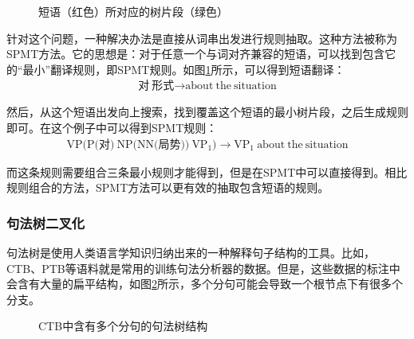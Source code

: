 \begin{figure}[htp]
\centering

\caption{短语（红色）所对应的树片段（绿色）}
\label{fig:4-57}
\end{figure}

\parinterval 针对这个问题，一种解决办法是直接从词串出发进行规则抽取。这种方法被称为SPMT方法\cite{marcu2006spmt:}。它的思想是：对于任意一个与词对齐兼容的短语，可以找到包含它的``最小''翻译规则，即SPMT规则。如图\ref{fig:4-57}所示，可以得到短语翻译：
\begin{eqnarray}
\textrm{对}\ \textrm{形式} \rightarrow \textrm{about}\ \textrm{the}\ \textrm{situation} \nonumber
\end{eqnarray}

\parinterval 然后，从这个短语出发向上搜索，找到覆盖这个短语的最小树片段，之后生成规则即可。在这个例子中可以得到SPMT规则：
\begin{eqnarray}
\textrm{VP(P(对)}\ \textrm{NP(NN(局势))}\ \textrm{VP}_1) \rightarrow \textrm{VP}_1\ \textrm{about}\ \textrm{the}\ \textrm{situation} \nonumber
\end{eqnarray}

\parinterval 而这条规则需要组合三条最小规则才能得到，但是在SPMT中可以直接得到。相比规则组合的方法，SPMT方法可以更有效的抽取包含短语的规则。


\subsubsection{句法树二叉化}

\parinterval 句法树是使用人类语言学知识归纳出来的一种解释句子结构的工具。比如， CTB\cite{xue2005building}、PTB\cite{DBLP:journals/coling/MarcusSM94}等语料就是常用的训练句法分析器的数据。但是，这些数据的标注中会含有大量的扁平结构，如图\ref{fig:4-58}所示，多个分句可能会导致一个根节点下有很多个分支。

\begin{figure}[htp]
\centering

\caption{CTB中含有多个分句的句法树结构}
\label{fig:4-58}
\end{figure}

